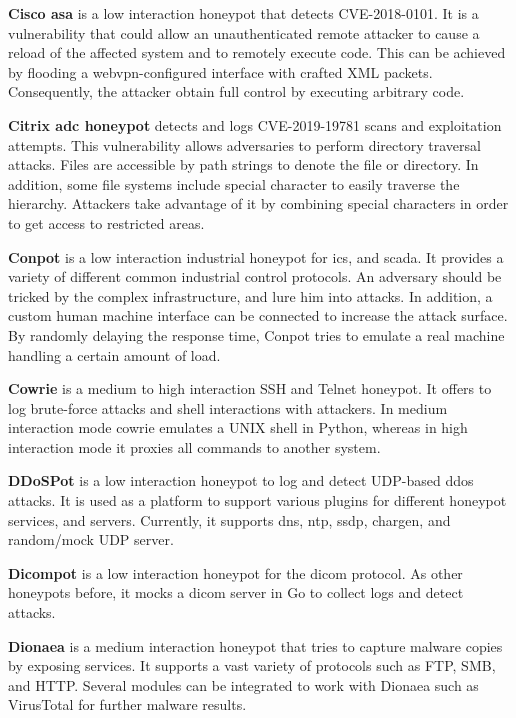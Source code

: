 \textbf{Cisco \ac{asa}} \cite{cymmetria2018} is a low interaction honeypot that detects CVE-2018-0101\cite{CVE-2018-0101}.
It is a vulnerability that could allow an unauthenticated remote attacker to cause a reload of the affected system and to remotely execute code.
This can be achieved by flooding a webvpn-configured interface with crafted XML packets.
Consequently, the attacker obtain full control by executing arbitrary code.

\textbf{Citrix \ac{adc} honeypot} \cite{citrixhoneypot2020} detects and logs CVE-2019-19781\cite{CVE-2019-19781} scans and exploitation attempts.
This vulnerability allows adversaries to perform directory traversal attacks.
Files are accessible by path strings to denote the file or directory.
In addition, some file systems include special character to easily traverse the hierarchy.
Attackers take advantage of it by combining special characters in order to get access to restricted areas. \cite{flanders2019}

\textbf{Conpot} \cite{conpot2021} is a low interaction industrial honeypot for \ac{ics}, and \ac{scada}.
It provides a variety of different common industrial control protocols.
An adversary should be tricked by the complex infrastructure, and lure him into attacks.
In addition, a custom human machine interface can be connected to increase the attack surface.
By randomly delaying the response time, Conpot tries to emulate a real machine handling a certain amount of load.

\textbf{Cowrie} \cite{cowrie2021} is a medium to high interaction SSH and Telnet honeypot.
It offers to log brute-force attacks and shell interactions with attackers.
In medium interaction mode cowrie emulates a UNIX shell in Python, whereas in high interaction mode it proxies all commands to another system.

\textbf{DDoSPot} \cite{ddosspot2021} is a low interaction honeypot to log and detect UDP-based \ac{ddos} attacks.
It is used as a platform to support various plugins for different honeypot services, and servers.
Currently, it supports \acs{dns}, \acs{ntp}, \acs{ssdp}, \acs{chargen}, and random/mock UDP server.

\textbf{Dicompot} \cite{dicompot2021} is a low interaction honeypot for the \ac{dicom} protocol.
As other honeypots before, it mocks a \ac{dicom} server in Go to collect logs and detect attacks.

\textbf{Dionaea} \cite{dionaea2021} is a medium interaction honeypot that tries to capture malware copies by exposing services.
It supports a vast variety of protocols such as FTP, SMB, and HTTP.
Several modules can be integrated to work with Dionaea such as VirusTotal for further malware results.

